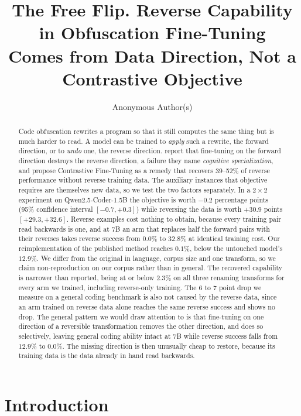 \documentclass{article}
\title{The Free Flip. Reverse Capability in Obfuscation Fine-Tuning\\
Comes from Data Direction, Not a Contrastive Objective}
\author{Anonymous Author(s)}
\begin{document}
\maketitle

\begin{abstract}
Code obfuscation rewrites a program so that it still computes the same thing but is much
harder to read. A model can be trained to \emph{apply} such a rewrite, the forward
direction, or to \emph{undo} one, the reverse direction.
\citet{nikiema2025contrastive} report that fine-tuning on the forward direction destroys
the reverse direction, a failure they name \emph{cognitive specialization}, and propose
Contrastive Fine-Tuning as a remedy that recovers 39--52\% of reverse performance without
reverse training data. The auxiliary instances that objective requires are themselves new
data, so we test the two factors separately. In a $2\times2$ experiment on
Qwen2.5-Coder-1.5B the objective is worth $-0.2$ percentage points (95\% confidence
interval $[-0.7,+0.3]$) while reversing the data is worth $+30.9$ points
$[+29.3,+32.6]$. Reverse examples cost nothing to obtain, because every training pair read
backwards is one, and at 7B an arm that replaces half the forward pairs with their reverses
takes reverse success from $0.0\%$ to $32.8\%$ at identical training cost. Our
reimplementation of the published method reaches $0.1\%$, below the untouched model's
$12.9\%$. We differ from the original in language, corpus size and one transform, so we claim
non-reproduction on our corpus rather than in general. The recovered capability is narrower than reported, being at or below $2.3\%$ on
all three renaming transforms for every arm we trained, including reverse-only training.
The 6 to 7 point drop we measure on a general coding benchmark is also not caused by the
reverse data, since an arm trained on reverse data alone reaches the same reverse success
and shows no drop. The general pattern we would draw attention to is that fine-tuning on one
direction of a reversible transformation removes the other direction, and does so
selectively, leaving general coding ability intact at 7B while reverse success falls from
$12.9\%$ to $0.0\%$. The missing direction is then unusually cheap to restore, because its
training data is the data already in hand read backwards.
\end{abstract}

\section{Introduction}
\end{document}
